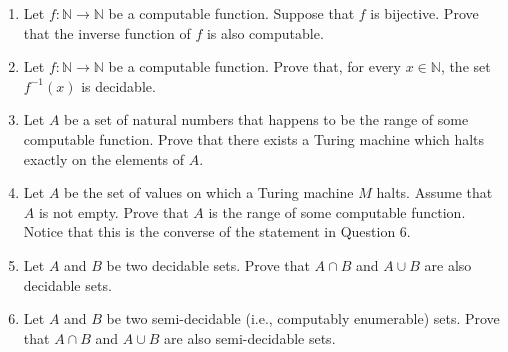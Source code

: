 \documentclass[11pt]{article}
\begin{document}
\begin{enumerate}[{\bf Q1.}]
        For all $x_1,\ldots,x_j\in\mathbb{N}$, $$(x_1,\ldots,x_j)\in A \Longleftrightarrow (\exists y_1,\ldots, y_k\in\mathbb{N}) [P(x_1,\ldots, x_j, y_1,\ldots, y_k) = 0 ].$$
        
        \begin{enumerate}
            \item Prove that the set of even numbers is a Diophantine subset of $\mathbb{N}$.
            \item Prove that the relation $<$ is a Diophantine subset of $\mathbb{N}^2$.
            \item Prove that every Diophantine subset of $\mathbb{N}$ is Turing recognizable (i.e., computably enumerable). 
        \end{enumerate} 

\newpage
 
  
    \item Let $f\colon \mathbb{N}\to\mathbb{N}$ be a computable function. Suppose that $f$ is bijective. Prove that the inverse function of $f$ is also computable. 
  
    \item  Let $f\colon \mathbb{N}\to\mathbb{N}$ be a computable function. Prove that, for every $x\in\mathbb{N}$, the set $f^{-1}(x)$ is decidable.

    \item Let $A$ be a set of natural numbers that happens to be the range of some computable function. Prove that there exists a Turing machine which halts exactly on the elements of $A$. 

    \item Let $A$ be the set of values on which a Turing machine $M$ halts. Assume that $A$ is not empty. Prove that $A$ is the range of some computable function. Notice that this is the converse of the statement in Question 6.

    \item Let $A$ and $B$ be two decidable sets. Prove that $A\cap B$ and $A\cup B$ are also decidable sets.

    \item Let $A$ and $B$ be two semi-decidable (i.e., computably enumerable) sets. Prove that $A\cap B$ and $A\cup B$ are also semi-decidable sets.

\end{enumerate}
\end{document}
